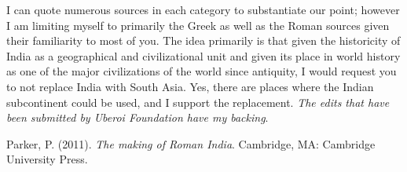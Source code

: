 I can quote numerous sources in each category to substantiate our point; however I am limiting myself to primarily the Greek as well as the Roman sources given their familiarity to most of you. The idea primarily is that given the historicity of India as a geographical and civilizational unit and given its place in world history as one of the major civilizations of the world since antiquity, I would request you to not replace India with South Asia. Yes, there are places where the Indian subcontinent could be used, and I support the replacement. \textit{The edits that have been submitted by Uberoi Foundation have my backing}.

\begin{thebibliography}{99}
 Parker, P. (2011). \textit{The making of Roman India}. Cambridge, MA: Cambridge University Press.
\end{thebibliography}
